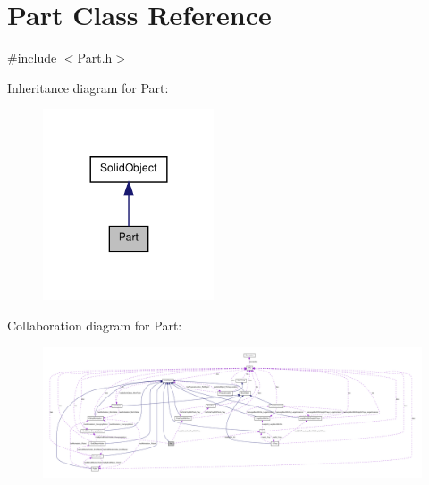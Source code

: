 \hypertarget{class_part}{
\section{Part Class Reference}
\label{class_part}
}


{\ttfamily \#include $<$Part.h$>$}



Inheritance diagram for Part:\nopagebreak
\begin{figure}[H]
\begin{center}
\leavevmode
\includegraphics[width=144pt]{class_part__inherit__graph}
\end{center}
\end{figure}


Collaboration diagram for Part:\nopagebreak
\begin{figure}[H]
\begin{center}
\leavevmode
\includegraphics[width=400pt]{class_part__coll__graph}
\end{center}
\end{figure}
